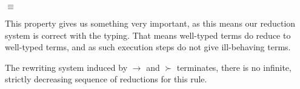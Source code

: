 \begin{myproof}
\begin{prooftree}
\end{prooftree}
$\equiv$
\begin{prooftree}
\end{prooftree}
\end{myproof}

This property gives us something very important, as this means our reduction system is correct with the typing. That means well-typed terms do reduce to well-typed terms, and as such execution steps do not give ill-behaving terms.

\begin{proposition}
The rewriting system induced by $\to$ and $\succ$ terminates, \ie there is no infinite, strictly decreasing sequence of reductions for this rule.\\
\end{proposition}

